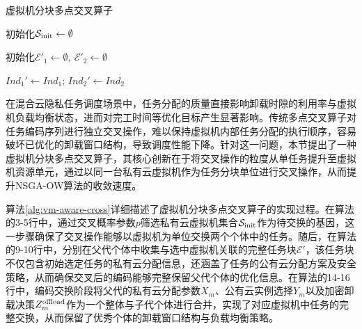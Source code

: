 \begin{algorithm}[htb!]
    \SetAlgoLined
    \caption{虚拟机分块多点交叉算子}\label{alg:vm-aware-cross}

    初始化$\mathcal{S}_{\rm init} \leftarrow \emptyset$\;

    初始化$\mathcal{E}'_1 \leftarrow \emptyset,\ \mathcal{E}'_2 \leftarrow \emptyset$\;

    \(Ind_1' \gets Ind_1\);
    \(Ind_2' \gets Ind_2\)


\end{algorithm}

在混合云隐私任务调度场景中，任务分配的质量直接影响卸载时隙的利用率与虚拟机负载均衡状态，进而对完工时间等优化目标产生显著影响。传统多点交叉算子对任务编码序列进行独立交叉操作，难以保持虚拟机内部任务分配的执行顺序，容易破坏已优化的卸载窗口结构，导致调度性能下降。针对这一问题，本节提出了一种虚拟机分块多点交叉算子，其核心创新在于将交叉操作的粒度从单任务提升至虚拟机资源单元，通过以同一台私有云虚拟机作为任务分块单位进行交叉操作，从而提升NSGA-OW算法的收敛速度。

算法\ref{alg:vm-aware-cross}详细描述了虚拟机分块多点交叉算子的实现过程。在算法的3-5行中，通过交叉概率参数$p$筛选私有云虚拟机集合$\mathcal{S}_{\rm init}$作为待交换的基因，这一步骤确保了交叉操作能够以虚拟机为单位交换两个个体中的任务。随后，在算法的9-10行中，分别在父代个体中收集与选中虚拟机关联的完整任务块$\mathcal{E}'$，该任务块不仅包含初始选定任务的私有云分配信息，还涵盖了任务的公有云分配方案及安全策略，从而确保交叉后的编码能够完整保留父代个体的优化信息。在算法的14-16行中，编码交换阶段将父代的私有云分配参数$X_m$、公有云实例选择$Y_m$以及加密卸载决策$Z^{\rm offload}_m$作为一个整体与子代个体进行合并，实现了对应虚拟机中任务的完整交换，从而保留了优秀个体的卸载窗口结构与负载均衡策略。

